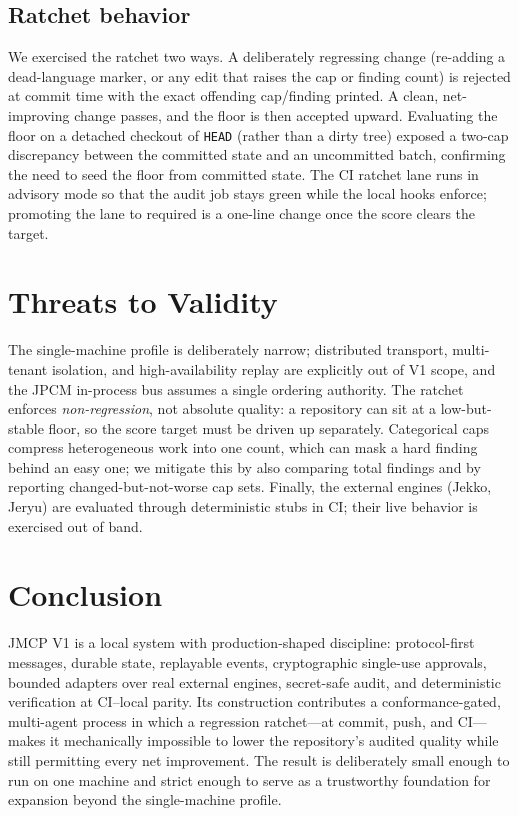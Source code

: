 \documentclass[conference]{IEEEtran}
\begin{document}
\subsection{Ratchet behavior}
We exercised the ratchet two ways. A deliberately regressing change (re-adding a
dead-language marker, or any edit that raises the cap or finding count) is
rejected at commit time with the exact offending cap/finding printed. A clean,
net-improving change passes, and the floor is then accepted upward. Evaluating
the floor on a detached checkout of \texttt{HEAD} (rather than a dirty tree)
exposed a two-cap discrepancy between the committed state and an uncommitted
batch, confirming the need to seed the floor from committed state. The CI
ratchet lane runs in advisory mode so that the audit job stays green while the
local hooks enforce; promoting the lane to required is a one-line change once
the score clears the target.

\section{Threats to Validity}

The single-machine profile is deliberately narrow; distributed transport,
multi-tenant isolation, and high-availability replay are explicitly out of V1
scope, and the JPCM in-process bus assumes a single ordering authority. The
ratchet enforces \emph{non-regression}, not absolute quality: a repository can
sit at a low-but-stable floor, so the score target must be driven up
separately. Categorical caps compress heterogeneous work into one count, which
can mask a hard finding behind an easy one; we mitigate this by also comparing
total findings and by reporting changed-but-not-worse cap sets. Finally, the
external engines (Jekko, Jeryu) are evaluated through deterministic stubs in CI;
their live behavior is exercised out of band.

\section{Conclusion}

JMCP V1 is a local system with production-shaped discipline: protocol-first
messages, durable state, replayable events, cryptographic single-use approvals,
bounded adapters over real external engines, secret-safe audit, and
deterministic verification at CI--local parity. Its construction contributes a
conformance-gated, multi-agent process in which a regression ratchet---at
commit, push, and CI---makes it mechanically impossible to lower the
repository's audited quality while still permitting every net improvement. The
result is deliberately small enough to run on one machine and strict enough to
serve as a trustworthy foundation for expansion beyond the single-machine
profile.
\end{document}
